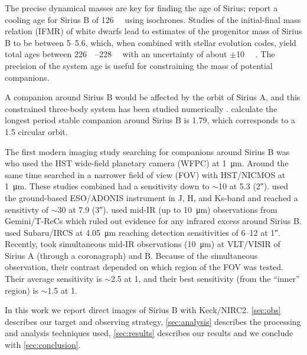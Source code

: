 \documentclass[twocolumn]{aastex631}
\begin{document}
The precise dynamical masses are key for finding the age of Sirius; \citet{bond_sirius_2017} report a cooling age for Sirius B of \qty{126}{\mega\year} using isochrones. Studies of the initial-final mass relation (IFMR) of white dwarfs \citep{cummings_two_2016} lead to estimates of the progenitor mass of Sirius B to be between \qtyrange{5}{5.6}{\solarmass}, which, when combined with stellar evolution codes, yield total ages between \qtyrange{226}{228}{\mega\year} with an uncertainty of about $\pm$\qty{10}{\mega\year} \citep{bond_sirius_2017}. The precision of the system age is useful for constraining the mass of potential companions.

A companion around Sirius B would be affected by the orbit of Sirius A, and this constrained three-body system has been studied numerically \citep{holman_long-term_1999}. \citet{bond_sirius_2017} calculate the longest period stable companion around Sirius B is \qty{1.79}{\year}, which corresponds to a \qty{1.5}{\au} circular orbit.

The first modern imaging study searching for companions around Sirius B was \citet{schroeder_search_2000} who used the HST wide-field planetary camera (WFPC) at \qty{1}{\micro\meter}. Around the same time \citet{kuchner_search_2000} searched in a narrower field of view (FOV) with HST/NICMOS at \qty{1}{\micro\meter}. These studies combined had a sensitivity down to $\sim$\qty{10}{\jupitermass} at \qty{5.3}{\au} (\ang{;;2}). \citet{bonnet-bidaud_adonis_2008} used the ground-based ESO/ADONIS instrument in J, H, and Ks-band and reached a sensitivty of $\sim$\qty{30}{\jupitermass} at \qty{7.9}{\au} (\ang{;;3}). \citet{skemer_sirius_2011} used mid-IR (up to \qty{10}{\micro\meter}) observations from Gemini/T-ReCs which ruled out evidence for any infrared excess around Sirius B. \citet{thalmann_piercing_2011} used Subaru/IRCS at \qty{4.05}{\micro\meter} reaching detection sensitivities of \qtyrange{6}{12}{\jupitermass} at \ang{;;1}. Recently, \citet{pathak_high_2021} took simultaneous mid-IR observations (\qty{10}{\micro\meter}) at VLT/VISIR of Sirius A (through a coronagraph) and B. Because of the simultaneous observation, their contrast depended on which region of the FOV was tested. Their average sensitivity is $\sim$\qty{2.5}{\jupitermass} at \qty{1}{\au}, and their best sensitivity (from the ``inner'' region) is $\sim$\qty{1.5}{\jupitermass} at \qty{1}{\au}.

In this work we report direct images of Sirius B with Keck/NIRC2. \autoref{sec:obs} describes our target and observing strategy, \autoref{sec:analysis} describes the processing and analysis techniques used, \autoref{sec:results} describes our results and we conclude with \autoref{sec:conclusion}.
\end{document}
